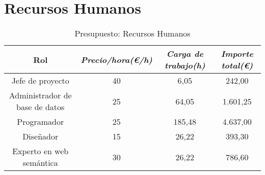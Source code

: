 \section{Recursos Humanos}

\begin{table}[htp]
	\centering
	\caption{Presupuesto: Recursos Humanos}\label{tab:budget-human}
	\begin{tabular}{cccc}
		\toprule
    	\textbf{Rol} & \emph{Precio/hora(\euro/h)} & \emph{Carga de trabajo(h)} & \emph{Importe total(\euro)}\\
    	\midrule
    	Jefe de proyecto				&	40			&	6,05 					& 	242,00\\
		Administrador de base de datos	&	25			&	64,05					&	1.601,25\\
		Programador						&	25			&	185,48					&	4.637,00\\
		Diseñador						&	15			&	26,22					&	393,30\\
		Experto en web semántica		&	30			&	26,22					&	786,60\\
    	\bottomrule
    \end{tabular}
\end{table}